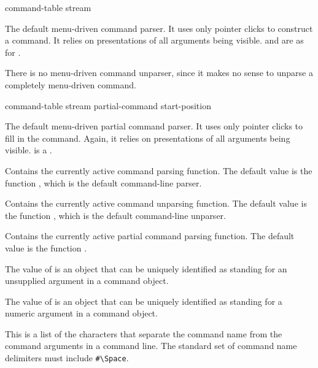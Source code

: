  {command-table stream}

The default menu-driven command parser.  It uses only pointer clicks to
construct a command.  It relies on presentations of all arguments being visible.
 and  are as for .

There is no menu-driven command unparser, since it makes no sense to unparse a
completely menu-driven command.

       {command-table stream partial-command start-position}

The default menu-driven partial command parser.  It uses only pointer clicks to
fill in the command.  Again, it relies on presentations of all arguments being
visible.   is a .



Contains the currently active command parsing function.  The default value is
the function , which is the default command-line
parser.


Contains the currently active command unparsing function.  The default value is
the function , which is the default
command-line unparser.


Contains the currently active partial command parsing function.  The default value
is the function .


The value of  is an object that can be uniquely
identified as standing for an unsupplied argument in a command object.


The value of  is an object that can be uniquely
identified as standing for a numeric argument in a command object.


This is a list of the characters that separate the command name from the command
arguments in a command line.  The standard set of command name delimiters must
include \verb+#\Space+.

